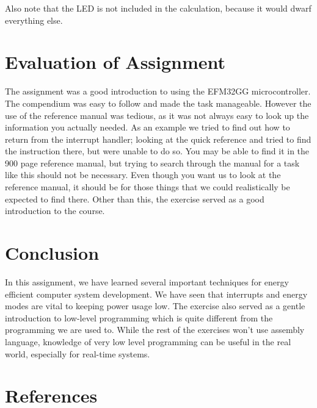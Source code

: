 \documentclass[a4paper, 12pt]{article}
\begin{document}
        Also note that the LED is not included in the calculation, because it would dwarf everything else.

\section{Evaluation of Assignment} %
\label{sec:evaluation_of_assignment}
	The assignment was a good introduction to using the EFM32GG microcontroller. The compendium was easy to follow and made the task manageable. However the use of the reference manual was tedious, as it was not always easy to look up the information you actually needed. As an example we tried to find out how to return from the interrupt handler; looking at the quick reference and tried to find the instruction there, but were unable to do so. You may be able to find it in the 900 page reference manual, but trying to search through the manual for a task like this should not be necessary. Even though you want us to look at the reference manual, it should be for those things that we could realistically be expected to find there. Other than this, the exercise served as a good introduction to the course.

\section{Conclusion} %
\label{sec:conclusion}
    In this assignment, we have learned several important techniques for energy efficient computer system development. We have seen that interrupts and energy modes are vital to keeping power usage low. The exercise also served as a gentle introduction to low-level programming which is quite different from the programming we are used to. While the rest of the exercises won't use assembly language, knowledge of very low level programming can be useful in the real world, especially for real-time systems.

\section{References} %
\label{sec:references}
    
\end{document}
